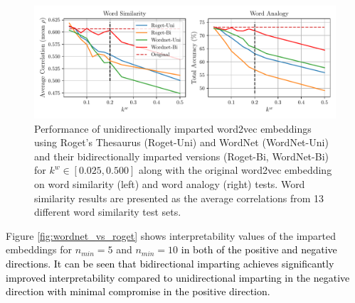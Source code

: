\documentclass[11pt,a4paper]{article}
\begin{document}
\begin{figure}
	\centering
	\includegraphics[width=16cm]{Figures/similarity_and_analogy.pdf}
	\caption{Performance of unidirectionally imparted word2vec embeddings using Roget's Thesaurus (Roget-Uni) and WordNet (WordNet-Uni) and their bidirectionally imparted versions (Roget-Bi, WordNet-Bi) for $k^w \in [0.025, 0.500]$ along with the original word2vec embedding on word similarity (left) and word analogy (right) tests. Word similarity results are presented as the average correlations from 13 different word similarity test sets.}
	\label{fig:sim_and_analogy}
\end{figure}

Figure \ref{fig:wordnet_vs_roget} shows interpretability values of the imparted embeddings for $n_{min} = 5$ and $n_{min} = 10$ \textcolor{black}{in both of the positive and negative directions. It can be seen that bidirectional imparting achieves significantly improved interpretability compared to unidirectional imparting in the negative direction with minimal compromise in the positive direction.}

\end{document}

